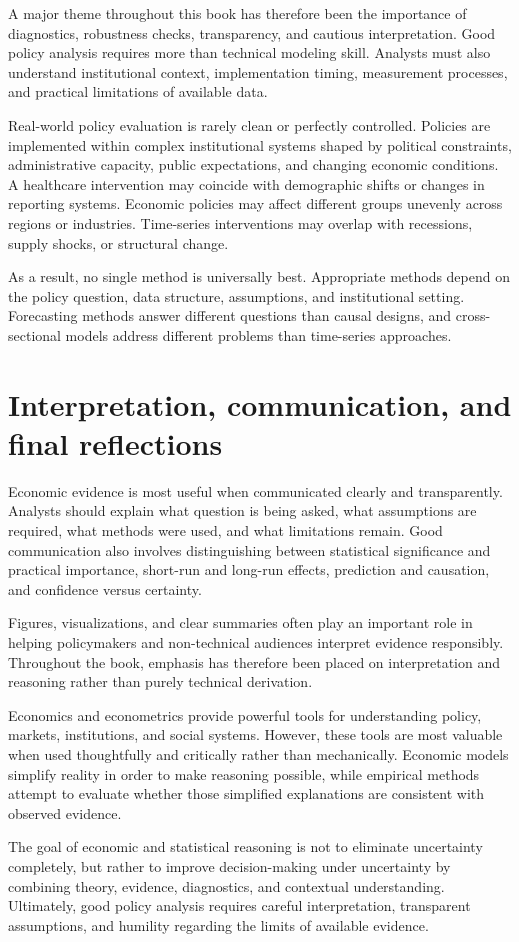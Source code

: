 \documentclass[
  11pt,
  oneside]{book}
\begin{document}
A major theme throughout this book has therefore been the importance of diagnostics, robustness checks, transparency, and cautious interpretation. Good policy analysis requires more than technical modeling skill. Analysts must also understand institutional context, implementation timing, measurement processes, and practical limitations of available data.

Real-world policy evaluation is rarely clean or perfectly controlled. Policies are implemented within complex institutional systems shaped by political constraints, administrative capacity, public expectations, and changing economic conditions. A healthcare intervention may coincide with demographic shifts or changes in reporting systems. Economic policies may affect different groups unevenly across regions or industries. Time-series interventions may overlap with recessions, supply shocks, or structural change.

As a result, no single method is universally best. Appropriate methods depend on the policy question, data structure, assumptions, and institutional setting. Forecasting methods answer different questions than causal designs, and cross-sectional models address different problems than time-series approaches.

\section{Interpretation, communication, and final reflections}\label{interpretation-communication-and-final-reflections}

Economic evidence is most useful when communicated clearly and transparently. Analysts should explain what question is being asked, what assumptions are required, what methods were used, and what limitations remain. Good communication also involves distinguishing between statistical significance and practical importance, short-run and long-run effects, prediction and causation, and confidence versus certainty.

Figures, visualizations, and clear summaries often play an important role in helping policymakers and non-technical audiences interpret evidence responsibly. Throughout the book, emphasis has therefore been placed on interpretation and reasoning rather than purely technical derivation.

Economics and econometrics provide powerful tools for understanding policy, markets, institutions, and social systems. However, these tools are most valuable when used thoughtfully and critically rather than mechanically. Economic models simplify reality in order to make reasoning possible, while empirical methods attempt to evaluate whether those simplified explanations are consistent with observed evidence.

The goal of economic and statistical reasoning is not to eliminate uncertainty completely, but rather to improve decision-making under uncertainty by combining theory, evidence, diagnostics, and contextual understanding. Ultimately, good policy analysis requires careful interpretation, transparent assumptions, and humility regarding the limits of available evidence.
\end{document}
